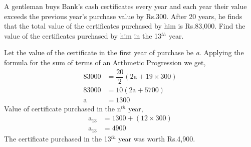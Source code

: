 
%
%
%
%
% 

\question[4] A gentleman buys Bank's cash certificates every year and each year their value exceeds the previous year's purchase value by Rs.300. After 20 years, he finds that the total value of the certificates purchased by him is Rs.83,000. Find the value of the certificates purchased by him in the 13$^{th}$ year.

\ifprintanswers
\fi 

\begin{solution}[\halfpage]
	Let the value of the certificate in the first year of purchase be \textit{a}. Applying the formula for the sum of terms of an Arthmetic Progression we get, 
	\begin{align}
			   83000 &= \dfrac{20}{2}\left(2\text{a}+19\times 300\right)\\
			   83000 &= 10\left(2\text{a} + 5700\right) \\
			\text{a} &= 1300   
	\end{align}
	Value of certificate purchased in the n$^{th}$ year,
	\begin{align}
		\text{a}_{13}&= 1300 + \left(12\times 300\right) \\
		\text{a}_{13}&= 4900
	\end{align}
	The certificate purchased in the 13$^{th}$ year was worth Rs.4,900.
\end{solution}
